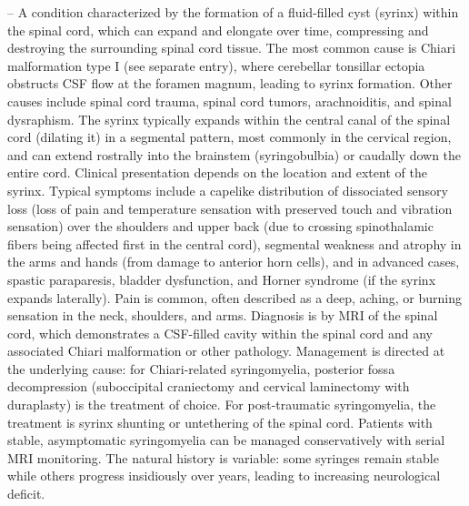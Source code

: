 -- A condition characterized by the formation of a fluid-filled cyst (syrinx) within the spinal cord, which can expand and elongate over time, compressing and destroying the surrounding spinal cord tissue. The most common cause is Chiari malformation type I (see separate entry), where cerebellar tonsillar ectopia obstructs CSF flow at the foramen magnum, leading to syrinx formation. Other causes include spinal cord trauma, spinal cord tumors, arachnoiditis, and spinal dysraphism. The syrinx typically expands within the central canal of the spinal cord (dilating it) in a segmental pattern, most commonly in the cervical region, and can extend rostrally into the brainstem (syringobulbia) or caudally down the entire cord. Clinical presentation depends on the location and extent of the syrinx. Typical symptoms include a capelike distribution of dissociated sensory loss (loss of pain and temperature sensation with preserved touch and vibration sensation) over the shoulders and upper back (due to crossing spinothalamic fibers being affected first in the central cord), segmental weakness and atrophy in the arms and hands (from damage to anterior horn cells), and in advanced cases, spastic paraparesis, bladder dysfunction, and Horner syndrome (if the syrinx expands laterally). Pain is common, often described as a deep, aching, or burning sensation in the neck, shoulders, and arms. Diagnosis is by MRI of the spinal cord, which demonstrates a CSF-filled cavity within the spinal cord and any associated Chiari malformation or other pathology. Management is directed at the underlying cause: for Chiari-related syringomyelia, posterior fossa decompression (suboccipital craniectomy and cervical laminectomy with duraplasty) is the treatment of choice. For post-traumatic syringomyelia, the treatment is syrinx shunting or untethering of the spinal cord. Patients with stable, asymptomatic syringomyelia can be managed conservatively with serial MRI monitoring. The natural history is variable: some syringes remain stable while others progress insidiously over years, leading to increasing neurological deficit.

